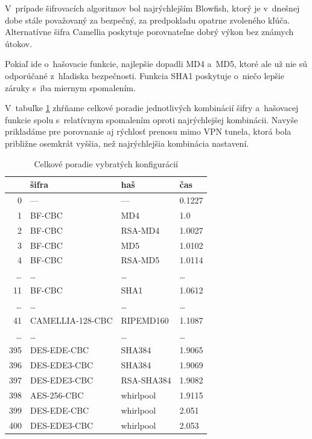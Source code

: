 \documentclass[12pt,a4paper]{article}
\begin{document}
V~prípade šifrovacích algoritmov bol najrýchlejším Blowfish, ktorý je
v~dnešnej dobe stále považovaný za bezpečný, za predpokladu opatrne
zvoleného kľúča. Alternatívne šifra Camellia poskytuje porovnateľne dobrý
výkon bez známych útokov.

Pokiaľ ide o~hašovacie funkcie, najlepšie dopadli MD4 a~MD5, ktoré ale už
nie sú odporúčané z~hľadiska bezpečnosti. Funkcia SHA1 poskytuje o~niečo
lepšie záruky s~iba miernym spomalením.

V~tabuľke \ref{tbl:config-chart} zhŕňame celkové poradie jednotlivých
kombinácií šifry a~hašovacej funkcie spolu s~relatívnym spomalením oproti
najrýchlejšej kombinácii. Navyše prikladáme pre porovnanie aj rýchlosť
prenosu mimo VPN tunela, ktorá bola približne osemkrát vyššia, než
najrýchlejšia kombinácia nastavení.

\begin{table}[h]\centering
    \begin{tabular}{|r|l|l|l|}
        \hline
            \ & šifra & haš & čas \\ \hline
            0 & --- & --- & 0.1227 \\ \hline
            1 & BF-CBC & MD4 & 1.0 \\ \hline
            2 & BF-CBC & RSA-MD4 & 1.0027 \\ \hline
            3 & BF-CBC & MD5 & 1.0102 \\ \hline
            4 & BF-CBC & RSA-MD5 & 1.0114 \\ \hline
            \dots & \dots & \dots & \dots \\ \hline
            11 & BF-CBC & SHA1 & 1.0612 \\ \hline
            \dots & \dots & \dots & \dots \\ \hline
            41 & CAMELLIA-128-CBC & RIPEMD160 & 1.1087 \\ \hline
            \dots & \dots & \dots & \dots \\ \hline
            395 & DES-EDE-CBC & SHA384 & 1.9065 \\ \hline
            396 & DES-EDE3-CBC & SHA384 & 1.9069 \\ \hline
            397 & DES-EDE3-CBC & RSA-SHA384 & 1.9082 \\ \hline
            398 & AES-256-CBC & whirlpool & 1.9115 \\ \hline
            399 & DES-EDE-CBC & whirlpool & 2.051 \\ \hline
            400 & DES-EDE3-CBC & whirlpool & 2.053 \\ \hline
    \end{tabular}
    \caption{Celkové poradie vybratých konfigurácií}
    \label{tbl:config-chart}
\end{table}
\end{document}
